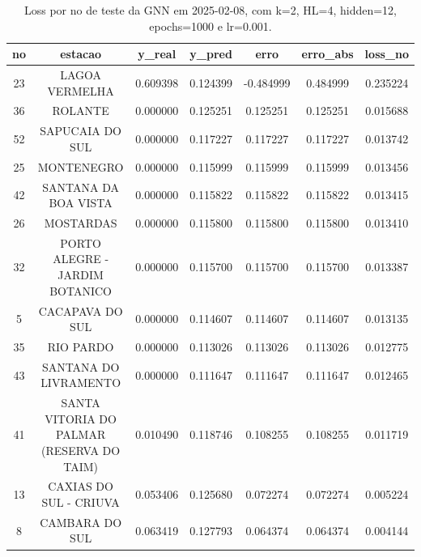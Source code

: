 \begin{table}[h]
\centering
\caption{Loss por no de teste da GNN em 2025-02-08, com k=2, HL=4, hidden=12, epochs=1000 e lr=0.001.}
\label{tab:gnn_loss_k2_hl4_h12_e1000_d20250208}
\begin{tabular}{ccccccc}
\toprule
no & estacao & y\_real & y\_pred & erro & erro\_abs & loss\_no \\
\midrule
23 & LAGOA VERMELHA & 0.609398 & 0.124399 & -0.484999 & 0.484999 & 0.235224 \\
36 & ROLANTE & 0.000000 & 0.125251 & 0.125251 & 0.125251 & 0.015688 \\
52 & SAPUCAIA DO SUL & 0.000000 & 0.117227 & 0.117227 & 0.117227 & 0.013742 \\
25 & MONTENEGRO & 0.000000 & 0.115999 & 0.115999 & 0.115999 & 0.013456 \\
42 & SANTANA DA BOA VISTA & 0.000000 & 0.115822 & 0.115822 & 0.115822 & 0.013415 \\
26 & MOSTARDAS & 0.000000 & 0.115800 & 0.115800 & 0.115800 & 0.013410 \\
32 & PORTO ALEGRE - JARDIM BOTANICO & 0.000000 & 0.115700 & 0.115700 & 0.115700 & 0.013387 \\
5 & CACAPAVA DO SUL & 0.000000 & 0.114607 & 0.114607 & 0.114607 & 0.013135 \\
35 & RIO PARDO & 0.000000 & 0.113026 & 0.113026 & 0.113026 & 0.012775 \\
43 & SANTANA DO LIVRAMENTO & 0.000000 & 0.111647 & 0.111647 & 0.111647 & 0.012465 \\
41 & SANTA VITORIA DO PALMAR (RESERVA DO TAIM) & 0.010490 & 0.118746 & 0.108255 & 0.108255 & 0.011719 \\
13 & CAXIAS DO SUL - CRIUVA & 0.053406 & 0.125680 & 0.072274 & 0.072274 & 0.005224 \\
8 & CAMBARA DO SUL & 0.063419 & 0.127793 & 0.064374 & 0.064374 & 0.004144 \\
\bottomrule
\end{tabular}
\end{table}
